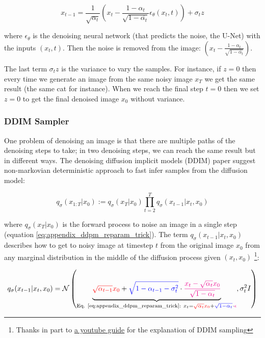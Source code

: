 \[ x_{t-1} = \frac{1}{\sqrt{\alpha_t}} \left( x_t - \frac{1 - \alpha_t}{\sqrt{1 - \bar{\alpha_t}}} \epsilon_\theta (x_t, t) \right) + \sigma_t z \]

where $\epsilon_\theta$ is the denoising neural network (that predicts the noise, the U-Net) with the inputs $(x_t, t)$. Then the noise is removed from the image: $\left( x_t - \frac{1 - \alpha_t}{\sqrt{1 - \bar{\alpha_t}}} \right)$. 

The last term $\sigma_t z$ is the variance to vary the samples. For instance, if $z=0$ then every time we generate an image from the same noisy image $x_T$ we get the same result (the same cat for instance). When we reach the final step $t=0$ then we set $z=0$ to get the final denoised image $x_0$ without variance.







\subsubsection{DDIM Sampler}

One problem of denoising an image is that there are multiple paths of the denoising steps to take; in two denoising steps, we can reach the same result but in different ways. The denoising diffusion implicit models (DDIM) paper \cite{ddim} suggest non-markovian deterministic approach to fast infer samples from the diffusion model:

\[ q_\sigma (x_{1:T} | x_0) := q_\sigma (x_T | x_0) \prod_{t=2}^{T} q_\sigma (x_{t-1} | x_t, x_0)\]

where $q_\sigma (x_T | x_0)$ is the forward process to noise an image in a single step (equation \ref{eq:appendix_ddpm_reparam_trick}). The term $q_\sigma (x_{t-1} | x_t, x_0)$ describes how to get to noisy image at timestep $t$ from the original image $x_0$ from any marginal distribution in the middle of the diffusion process given $(x_t, x_0)$ \footnote{Thanks in part to \href{https://www.youtube.com/watch?v=r4V0vLhYZIQ&t=686s}{a youtube guide} for the explanation of DDIM sampling}:

\begin{equation}
q_\sigma (x_{t-1} | x_t, x_0) = \mathcal{N} \left( 
\underbrace{
    \textcolor{red}{\sqrt{\alpha_{t-1}} x_0} + \textcolor{blue}{\sqrt{1 - \alpha_{t-1} - \sigma_t^2}} \cdot \textcolor{magenta}{\frac{x_t - \sqrt{\alpha_t} x_0}{\sqrt{1 - \alpha_t}}}
}_{
    \text{Eq. \ref{eq:appendix_ddpm_reparam_trick}:}\ x_t = \textcolor{red}{\sqrt{\alpha_t} x_0} + \textcolor{blue}{\sqrt{1 - \alpha_t}} \cdot \textcolor{magenta}{\epsilon}
}, \sigma_t^2 I 
\right)
\label{eq:appendix_ddim_q}
\end{equation}

